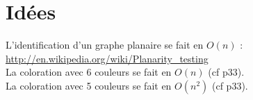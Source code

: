 \clearpage
\section{Idées}
L'identification d'un graphe planaire se fait en $O(n)$ :
\url{http://en.wikipedia.org/wiki/Planarity_testing}\\
La coloration avec 6 couleurs se fait en $O(n)$ (cf \cite{jensen1996graph} p33).\\
La coloration avec 5 couleurs se fait en $O(n^2)$ (cf \cite{jensen1996graph} p33).